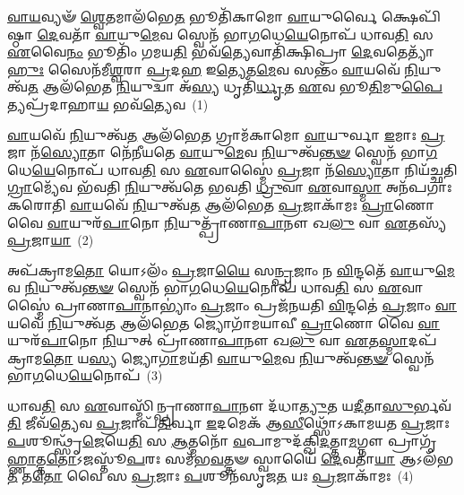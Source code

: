 \setcounter{anuvakam}{0}
\-\ul{𑌵𑌾}\-\-\ul{𑌯}\-𑌵𑍍𑌯𑍟᳴ \ul{𑌶𑍍𑌵𑍇}\-𑌤𑌮𑌾\-𑌲᳴𑌭𑍇\-\ul{𑌤} 𑌭𑍂𑌤𑌿᳴𑌕𑌾𑌮𑍋 \ul{𑌵𑌾}\-𑌯𑍁𑌰𑍍𑌵𑍈 𑌕𑍍𑌷𑍇𑌪𑌿᳴𑌷𑍍𑌠𑌾 \ul{𑌦𑍇}\-𑌵𑌤𑌾᳴ \ul{𑌵𑌾}\-𑌯𑍁\-\ul{𑌮𑍇}\-𑌵 𑌸𑍍𑌵𑍇𑌨᳴ 𑌭𑌾\-\ul{𑌗}\-𑌧𑍇\-\ul{𑌯𑍇}\-𑌨𑍋𑌪᳴ 𑌧𑌾𑌵\-\ul{𑌤𑌿} 𑌸 \ul{𑌏}\-𑌵𑍈\-\ul{𑌨𑌂} 𑌭𑍂𑌤𑌿𑌂᳴ 𑌗𑌮𑌯\-\ul{𑌤𑌿} 𑌭𑌵᳴\-\ul{𑌤𑍍𑌯𑍇}\-𑌵𑌾𑌤𑌿᳴𑌕𑍍𑌷𑌿𑌪𑍍𑌰𑌾 \ul{𑌦𑍇}\-𑌵𑌤𑍇𑌤𑍍𑌯𑌾᳴\-\ul{𑌹𑍁𑌃} 𑌸𑍈𑌨᳴𑌮𑍀\-\ul{𑌶𑍍𑌵}\-𑌰𑌾 \ul{𑌪𑍍𑌰}\-𑌦\-\ul{𑌹} 𑌇\-\ul{𑌤𑍍𑌯𑍇}\-𑌤\-\ul{𑌮𑍇}\-𑌵 𑌸𑌨𑍍𑌤𑌂᳴ \ul{𑌵𑌾}\-𑌯𑌵𑍇᳴ \ul{𑌨𑌿}\-𑌯𑍁𑌤𑍍𑌵᳴\-\ul{𑌤} 𑌆𑌲᳴𑌭𑍇𑌤 \ul{𑌨𑌿}\-𑌯𑍁𑌦𑍍𑌵𑌾 𑌅᳴\-\ul{𑌸𑍍𑌯} 𑌧𑍃𑌤𑌿᳴\-\ul{𑌰𑍍𑌧𑍃}\-𑌤 \ul{𑌏}\-𑌵 𑌭𑍂\-\ul{𑌤𑌿}\-𑌮𑍁\-\ul{𑌪𑍈}\-𑌤𑍍𑌯𑌪𑍍𑌰᳴𑌦𑌾𑌹𑌾\-\ul{𑌯} 𑌭𑌵᳴\-\ul{𑌤𑍍𑌯𑍇}\-𑌵~(1)

\-\ul{𑌵𑌾}\-𑌯𑌵𑍇᳴ \ul{𑌨𑌿}\-𑌯𑍁𑌤𑍍𑌵᳴\-\ul{𑌤} 𑌆\-𑌲᳴𑌭𑍇\-\ul{𑌤} 𑌗𑍍𑌰𑌾𑌮᳴𑌕𑌾𑌮𑍋 \ul{𑌵𑌾}\-𑌯𑍁𑌰𑍍𑌵𑌾 \ul{𑌇}\-𑌮𑌾𑌃 \ul{𑌪𑍍𑌰}\-𑌜𑌾 𑌨᳴\-\ul{𑌸𑍍𑌯𑍋}\-𑌤𑌾 𑌨𑍇᳴𑌨𑍀𑌯𑌤𑍇 \ul{𑌵𑌾}\-𑌯𑍁\-\ul{𑌮𑍇}\-𑌵 \ul{𑌨𑌿}\-𑌯𑍁𑌤𑍍𑌵᳴\-\ul{𑌨𑍍𑌤}\-\-\ul{𑍟} 𑌸𑍍𑌵𑍇𑌨᳴ 𑌭𑌾\-\ul{𑌗}\-𑌧𑍇\-\ul{𑌯𑍇}\-𑌨𑍋𑌪᳴ 𑌧𑌾𑌵\-\ul{𑌤𑌿} 𑌸 \ul{𑌏}\-𑌵𑌾𑌸𑍍𑌮𑍈॑ \ul{𑌪𑍍𑌰}\-𑌜𑌾 𑌨᳴\-\ul{𑌸𑍍𑌯𑍋}\-𑌤𑌾 𑌨𑌿𑌯᳴𑌚𑍍𑌛𑌤𑌿 \ul{𑌗𑍍𑌰𑌾}\-𑌮𑍍𑌯𑍇᳴𑌵 𑌭᳴𑌵𑌤𑌿 \ul{𑌨𑌿}\-𑌯𑍁𑌤𑍍𑌵᳴𑌤𑍇 𑌭𑌵𑌤𑌿 \ul{𑌧𑍍𑌰𑍁}\-𑌵𑌾 \ul{𑌏}\-𑌵𑌾\-\ul{𑌸𑍍𑌮𑌾} 𑌅𑌨᳴𑌪𑌗𑌾𑌃 𑌕𑌰𑍋𑌤𑌿 \ul{𑌵𑌾}\-𑌯𑌵𑍇᳴ \ul{𑌨𑌿}\-𑌯𑍁𑌤𑍍𑌵᳴\-\ul{𑌤} 𑌆𑌲᳴𑌭𑍇𑌤 \ul{𑌪𑍍𑌰}\-𑌜𑌾𑌕𑌾᳴𑌮𑌃 \ul{𑌪𑍍𑌰𑌾}\-𑌣𑍋 𑌵𑍈 \ul{𑌵𑌾}\-𑌯𑍁𑌰᳴\-\ul{𑌪𑌾}\-𑌨𑍋 \ul{𑌨𑌿}\-𑌯𑍁𑌤𑍍𑌪𑍍𑌰𑌾᳴𑌣𑌾\-\ul{𑌪𑌾}\-𑌨𑍗 𑌖\-\ul{𑌲𑍁} 𑌵𑌾 \ul{𑌏}\-𑌤𑌸𑍍𑌯᳴ \ul{𑌪𑍍𑌰}\-𑌜𑌾\-\ul{𑌯𑌾}\-~(2)

𑌅𑌪᳴𑌕𑍍𑌰𑌾𑌮\-\ul{𑌤𑍋} 𑌯𑍋\-𑌽𑌲𑌂᳴ \ul{𑌪𑍍𑌰}\-𑌜𑌾\-\ul{𑌯𑍈} 𑌸\-\ul{𑌨𑍍𑌪𑍍𑌰}\-𑌜𑌾𑌂 𑌨 \ul{𑌵𑌿}\-𑌨𑍍𑌦𑌤𑍇᳴ \ul{𑌵𑌾}\-𑌯𑍁\-\ul{𑌮𑍇}\-𑌵 \ul{𑌨𑌿}\-𑌯𑍁𑌤𑍍𑌵᳴\-\ul{𑌨𑍍𑌤}\-\-\ul{𑍟} 𑌸𑍍𑌵𑍇𑌨᳴ 𑌭𑌾\-\ul{𑌗}\-𑌧𑍇\-\ul{𑌯𑍇}\-𑌨𑍋𑌪᳴ 𑌧𑌾𑌵\-\ul{𑌤𑌿} 𑌸 \ul{𑌏}\-𑌵𑌾𑌸𑍍𑌮𑍈॑ 𑌪𑍍𑌰𑌾𑌣𑌾\-\ul{𑌪𑌾}\-𑌨𑌾\-𑌭𑍍𑌯𑌾𑌂॑ \ul{𑌪𑍍𑌰}\-𑌜𑌾𑌂 𑌪𑍍𑌰𑌜᳴𑌨𑌯𑌤𑌿 \ul{𑌵𑌿}\-𑌨𑍍𑌦𑌤𑍇॑ \ul{𑌪𑍍𑌰}\-𑌜𑌾𑌂 \ul{𑌵𑌾}\-𑌯𑌵𑍇᳴ \ul{𑌨𑌿}\-𑌯𑍁𑌤𑍍𑌵᳴\-\ul{𑌤} 𑌆\-𑌲᳴𑌭𑍇\-\ul{𑌤} 𑌜𑍍𑌯𑍋𑌗𑌾᳴𑌮𑌯𑌾𑌵𑍀 \ul{𑌪𑍍𑌰𑌾}\-𑌣𑍋 𑌵𑍈 \ul{𑌵𑌾}\-𑌯𑍁𑌰᳴\-\ul{𑌪𑌾}\-𑌨𑍋 \ul{𑌨𑌿}\-𑌯𑍁𑌤𑍍 𑌪𑍍𑌰𑌾᳴𑌣𑌾\-\ul{𑌪𑌾}\-𑌨𑍗 𑌖\-\ul{𑌲𑍁} 𑌵𑌾 \ul{𑌏}\-𑌤\-\ul{𑌸𑍍𑌮𑌾}\-𑌦𑌪᳴𑌕𑍍𑌰𑌾𑌮\-\ul{𑌤𑍋} 𑌯\-\ul{𑌸𑍍𑌯} 𑌜𑍍𑌯𑍋\-\ul{𑌗𑌾}\-𑌮𑌯᳴𑌤𑌿 \ul{𑌵𑌾}\-𑌯𑍁\-\ul{𑌮𑍇}\-𑌵 \ul{𑌨𑌿}\-𑌯𑍁𑌤𑍍𑌵᳴\-\ul{𑌨𑍍𑌤}\-\-\ul{𑍟} 𑌸𑍍𑌵𑍇𑌨᳴ 𑌭𑌾\-\ul{𑌗}\-𑌧𑍇\-\ul{𑌯𑍇}\-𑌨𑍋𑌪᳴~(3)

𑌧𑌾𑌵\-\ul{𑌤𑌿} 𑌸 \ul{𑌏}\-𑌵𑌾𑌸𑍍𑌮𑌿᳴𑌨𑍍𑌪𑍍𑌰𑌾𑌣𑌾\-\ul{𑌪𑌾}\-𑌨𑍗 𑌦᳴𑌧𑌾\-\ul{𑌤𑍍𑌯𑍁}\-𑌤 𑌯\-\ul{𑌦𑍀}\-𑌤𑌾\-\ul{𑌸𑍁}\-𑌰𑍍𑌭𑌵᳴\-\ul{𑌤𑌿} 𑌜𑍀𑌵᳴\-\ul{𑌤𑍍𑌯𑍇}\-𑌵 \ul{𑌪𑍍𑌰}\-𑌜𑌾𑌪᳴\-\ul{𑌤𑌿}\-𑌰𑍍𑌵𑌾 \ul{𑌇}\-𑌦𑌮𑍇𑌕᳴ 𑌆\-\ul{𑌸𑍀}\-𑌥𑍍𑌸𑍋᳴\-𑌽𑌕𑌾𑌮𑌯𑌤 \ul{𑌪𑍍𑌰}\-𑌜𑌾𑌃 \ul{𑌪}\-𑌶𑍂𑌨𑍍𑌥𑍍𑌸𑍃᳴\-\ul{𑌜𑍇}\-𑌯𑍇\-\ul{𑌤𑌿} 𑌸 \ul{𑌆}\-𑌤𑍍𑌮𑌨𑍋᳴ \ul{𑌵}\-𑌪𑌾𑌮𑍁𑌦᳴𑌕𑍍𑌖𑌿\-\ul{𑌦}\-𑌤𑍍𑌤𑌾\-\ul{𑌮}\-𑌗𑍍𑌨𑍗 𑌪𑍍𑌰𑌾𑌗𑍃᳴\-\ul{𑌹𑍍𑌣𑌾}\-𑌤𑍍𑌤\-\ul{𑌤𑍋}\-\-𑌽𑌜𑌸𑍍𑌤𑍂᳴\-\ul{𑌪}\-𑌰𑌃 𑌸𑌮᳴𑌭\-\ul{𑌵}\-𑌤𑍍𑌤𑍟 𑌸𑍍𑌵𑌾𑌯𑍈᳴ \ul{𑌦𑍇}\-𑌵𑌤𑌾᳴\-\ul{𑌯𑌾} 𑌆\-𑌽𑌲᳴𑌭\-\ul{𑌤} 𑌤\-\ul{𑌤𑍋} 𑌵𑍈 𑌸 \ul{𑌪𑍍𑌰}\-𑌜𑌾𑌃 \ul{𑌪}\-𑌶𑍂𑌨᳴𑌸𑍃𑌜\-\ul{𑌤} 𑌯𑌃 \ul{𑌪𑍍𑌰}\-𑌜𑌾𑌕𑌾᳴𑌮𑌃~(4)


